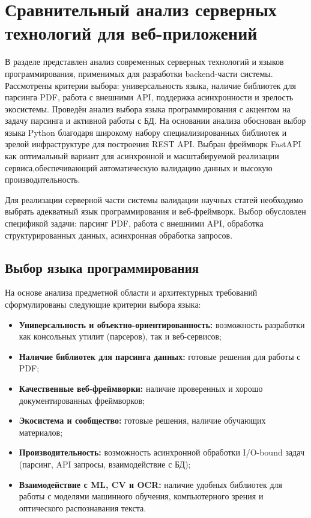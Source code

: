 \section{Сравнительный анализ серверных технологий для веб-приложений}
\begin{annotation}
	В разделе представлен анализ современных серверных технологий и языков
	программирования, применимых для разработки backend-части системы. Рассмотрены критерии 
	выбора: универсальность языка, наличие библиотек для парсинга PDF, работа с
	внешними API, поддержка асинхронности и зрелость экосистемы. Проведён анализ выбора 
	языка программирования с акцентом на задачу парсинга и активной работы с БД. На
	основании анализа обоснован выбор языка Python благодаря широкому набору специализированных
	библиотек и зрелой инфраструктуре для построения REST API. Выбран фреймворк 
	FastAPI как оптимальный вариант для асинхронной и масштабируемой реализации
	сервиса,обеспечивающий автоматическую валидацию данных и
	высокую производительность.
\end{annotation}

Для реализации серверной части системы валидации научных статей необходимо выбрать
адекватный язык программирования и веб-фреймворк. Выбор обусловлен спецификой задачи:
парсинг PDF, работа с внешними API, обработка структурированных данных,
асинхронная обработка запросов.

\subsection{Выбор языка программирования}

На основе анализа предметной области и архитектурных требований сформулированы
следующие критерии выбора языка:

\begin{itemize}
	\item \textbf{Универсальность и объектно-ориентированность:} возможность разработки как консольных утилит (парсеров), так и веб-сервисов;
	\item \textbf{Наличие библиотек для парсинга данных:} готовые решения для работы с PDF;
	\item \textbf{Качественные веб-фреймворки:} наличие проверенных и хорошо документированных фреймворков;
	\item \textbf{Экосистема и сообщество:} готовые решения, наличие обучающих материалов;
	\item \textbf{Производительность:} возможность асинхронной обработки I/O-bound задач (парсинг, API запросы, взаимодействие с БД);
	\item \textbf{Взаимодействие с ML, CV и OCR:} наличие удобных библиотек для работы с моделями машинного обучения, компьютерного зрения и оптического распознавания текста.
\end{itemize}

